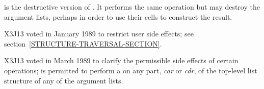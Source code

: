 \begin{defun}[Function]
 is the destructive version of .
It performs the same operation but may destroy the argument lists,
perhaps in order to use their cells to construct the result.

\begin{new}
X3J13 voted in January 1989
to restrict user side effects; see section~\ref{STRUCTURE-TRAVERSAL-SECTION}.
\end{new}

\begin{newer}
X3J13 voted in March 1989 
to clarify the permissible side effects of certain operations;
 is permitted to perform a  on any part,
{\it car} or {\it cdr}, of the top-level list structure of 
any of the argument lists.
\end{newer}
\end{defun}

